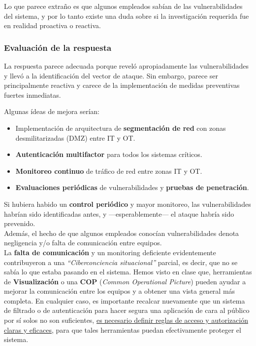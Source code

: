Lo que parece extraño es que algunos empleados sabían de las vulnerabilidades del sistema, y por lo tanto existe una duda sobre si la investigación requerida fue en realidad proactiva o reactiva.

\subsubsection{Evaluación de la respuesta}
La respuesta parece adecuada porque reveló apropiadamente las vulnerabilidades y llevó a la identificación del vector de ataque. Sin embargo, parece ser principalmente reactiva y carece de la implementación de medidas preventivas fuertes inmediatas.

Algunas ídeas de mejora serían:
\begin{itemize}
    \item Implementación de arquitectura de \textbf{segmentación de red} con zonas desmilitarizadas (DMZ) entre \textsc{IT} y \textsc{OT}.
    \item \textbf{Autenticación multifactor} para todos los sistemas críticos.
    \item \textbf{Monitoreo continuo} de tráfico de red entre zonas \textsc{IT} y \textsc{OT}.
    \item \textbf{Evaluaciones periódicas} de vulnerabilidades y \textbf{pruebas de penetración}.
\end{itemize}

Si hubiera habido un \textbf{control periódico} y mayor monitoreo, las vulnerabilidades habrían sido identificadas antes, y ---esperablemente--- el ataque habría sido prevenido.\\
Además, el hecho de que algunos empleados conocían vulnerabilidades denota negligencia y/o falta de comunicación entre equipos.\\
La \textbf{falta de comunicación} y un monitoring deficiente evidentemente contribuyeron a una \textit{``Ciberconciencia situacional''} parcial, es decir, que no se sabía lo que estaba pasando en el sistema. Hemos visto en clase que, herramientas de \textbf{Visualización} o una \textbf{COP} (\textit{Common Operational Picture}) pueden ayudar a mejorar la comunicación entre los equipos y a obtener una vista general más completa.
En cualquier caso, es importante recalcar nuevamente que un sistema de filtrado o de autenticación para hacer segura una aplicación de cara al público por sí solos no son suficientes, \ul{es necesario definir reglas de acceso y autorización claras y eficaces}, para que tales herramientas puedan efectivamente proteger el sistema.
\newpage
